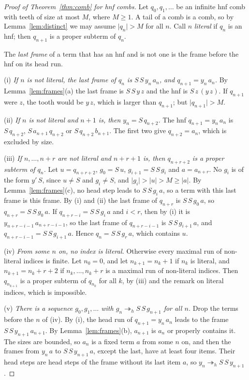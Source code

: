 \documentclass[11pt]{amsart}
\theoremstyle{definition}
\newcommand{\hred}{\twoheadrightarrow_h}
\newcommand{\sz}[1]{\lvert#1\rvert}
\begin{document}
\begin{proof}[Proof of Theorem~\ref{thm:comb} for hnf combs]
Let $q_0,q_1,\dots$ be an infinite hnf comb with teeth of size at most $M$, where $M\ge1$. A tail
of a comb is a comb, so by Lemma~\ref{lem:distinct} we may assume $\sz{q_n}>M$ for all $n$. Call $n$
\emph{literal} if $q_n$ is an hnf; then $q_{n+1}$ is a proper subterm of $q_n$.

The \emph{last frame} of a term that has an hnf and is not one is the frame before the hnf on its head run.

(i) \emph{If $n$ is not literal, the last frame of $q_n$ is $S\,S\,y_n\,a_n$, and
$q_{n+1}=y_n\,a_n$.} By Lemma~\ref{lem:frames}(a) the last frame is $S\,S\,y\,z$ and the hnf is
$S\,z\,(y\,z)$. If $q_{n+1}$ were $z$, the tooth would be $y\,z$, which is larger than $q_{n+1}$; but $\sz{q_{n+1}}>M$.

(ii) \emph{If $n$ is not literal and $n+1$ is, then $y_n=S\,q_{n+2}$.} The hnf $q_{n+1}=y_n\,a_n$ is
$S\,q_{n+2}$, $S\,a_{n+1}\,q_{n+2}$ or $S\,q_{n+2}\,b_{n+1}$. The first two give $q_{n+2}=a_n$, which is excluded by size.

(iii) \emph{If $n,\dots,n+r$ are not literal and $n+r+1$ is, then $q_{n+r+2}$ is a proper subterm of
$q_n$.} Let $u=q_{n+r+2}$, $g_0=S\,u$, $g_{i+1}=S\,S\,g_i$ and $a=a_{n+r}$. No $g_i$ is of the form
$y'\,S$, since $u\ne S$ and $g_i\ne S$, and $\sz{g_i}>\sz u>M\ge\sz a$. By Lemma~\ref{lem:frames}(c), no head step leads to
$S\,S\,g_i\,a$, so a term with this last frame is this frame. By (i) and (ii) the last
frame of $q_{n+r}$ is $S\,S\,g_0\,a$, so $q_{n+r}=S\,S\,g_0\,a$. If $q_{n+r-i}=S\,S\,g_i\,a$ and
$i<r$, then by (i) it is $y_{n+r-i-1}\,a_{n+r-i-1}$, so the last frame of $q_{n+r-i-1}$ is
$S\,S\,g_{i+1}\,a$, and $q_{n+r-i-1}=S\,S\,g_{i+1}\,a$. Hence $q_n=S\,S\,g_r\,a$, which contains $u$.

(iv) \emph{From some $n$ on, no index is literal.} Otherwise every maximal run of non-literal indices is finite. Let $n_0=0$, and let
$n_{k+1}=n_k+1$ if $n_k$ is literal, and $n_{k+1}=n_k+r+2$ if $n_k,\dots,n_k+r$ is a maximal run of
non-literal indices. Then $q_{n_{k+1}}$ is a proper subterm of $q_{n_k}$ for all $k$, by (iii) and the remark on literal indices, which is impossible.

(v) \emph{There is a sequence $g_0,g_1,\dots$ with $g_n\hred S\,S\,g_{n+1}$ for all $n$.} Drop the
terms before the $n$ of (iv). By (i), the head run of $q_{n+1}=y_n\,a_n$ leads to the frame
$S\,S\,y_{n+1}\,a_{n+1}$. By Lemma~\ref{lem:frames}(b), $a_{n+1}$ is $a_n$ or properly contains it. The sizes are bounded, so $a_n$ is
a fixed term $a$ from some $n$ on, and then the frames from $y_n\,a$ to $S\,S\,y_{n+1}\,a$, except the last,
have at least four items. Their head steps are head steps of the frame without its last item $a$,
so $y_n\hred S\,S\,y_{n+1}$.


\end{proof}
\end{document}
